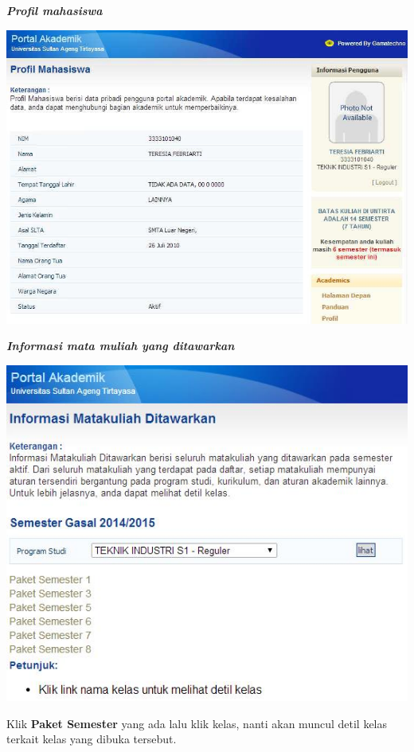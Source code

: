 \documentclass[
]{book}
\begin{document}
\begin{enumerate}
  \textbf{\emph{Profil mahasiswa}}

  \includegraphics[width=8.33333in,height=\textheight]{static/3.3.jpg}

  \textbf{\emph{Informasi mata muliah yang ditawarkan}}

  \includegraphics{static/3.4.jpg}

  Klik \textbf{Paket Semester} yang ada lalu klik kelas, nanti akan muncul detil kelas terkait kelas yang
  dibuka tersebut.


\end{enumerate}
\end{document}
